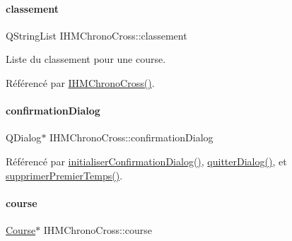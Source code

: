 \paragraph{\texorpdfstring{classement}{classement}}
{\footnotesize\ttfamily Q\+String\+List I\+H\+M\+Chrono\+Cross\+::classement\hspace{0.3cm}{\ttfamily [private]}}



Liste du classement pour une course. 



Référencé par \hyperlink{class_i_h_m_chrono_cross_a479fc90733fba3e65fb06aa4a3adc02e}{I\+H\+M\+Chrono\+Cross()}.

\mbox{\label{class_i_h_m_chrono_cross_ad7fc4afa5689501063cc207a8daf5752}} 
\paragraph{\texorpdfstring{confirmation\+Dialog}{confirmationDialog}}
{\footnotesize\ttfamily Q\+Dialog$\ast$ I\+H\+M\+Chrono\+Cross\+::confirmation\+Dialog\hspace{0.3cm}{\ttfamily [private]}}



Référencé par \hyperlink{class_i_h_m_chrono_cross_a866a247fad23eca2af31ed985afe7cd3}{initialiser\+Confirmation\+Dialog()}, \hyperlink{class_i_h_m_chrono_cross_a1e8e6d42ec7397a619940bc7bec4a6ca}{quitter\+Dialog()}, et \hyperlink{class_i_h_m_chrono_cross_aca8b5d6683a3ab0018066ec16968f3f3}{supprimer\+Premier\+Temps()}.

\mbox{\label{class_i_h_m_chrono_cross_a03a8226c0e7f423d29302d9a06284ab4}} 
\paragraph{\texorpdfstring{course}{course}}
{\footnotesize\ttfamily \hyperlink{class_course}{Course}$\ast$ I\+H\+M\+Chrono\+Cross\+::course\hspace{0.3cm}{\ttfamily [private]}}



